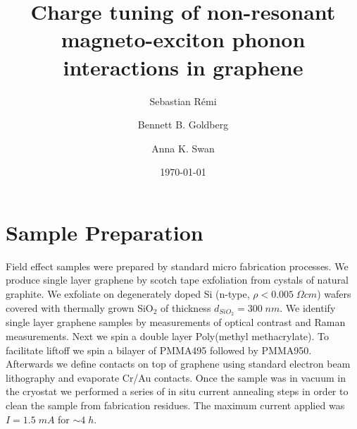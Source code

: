 \documentclass[pra,aps,superscriptaddress,preprint]{revtex4-1}
\begin{document}
\title{Charge tuning of non-resonant magneto-exciton phonon interactions in graphene} %

\author{Sebastian R\'{e}mi}

\author{Bennett B. Goldberg}


\author{Anna K. Swan}


\date{\today}



\pacs{}%

\maketitle %

\section{Sample Preparation}
Field effect samples were prepared by standard micro fabrication processes. We produce single layer graphene by scotch tape exfoliation from cystals of natural graphite. We exfoliate on degenerately doped Si (n-type, $\rho < 0.005\; \Omega cm$) wafers covered with thermally grown SiO$_2$ of thickness $d_{SiO_2}=300\; nm$. We identify single layer graphene samples by measurements of optical contrast and Raman measurements. Next we spin a double layer Poly(methyl methacrylate). To facilitate liftoff we spin a bilayer of PMMA495 followed by PMMA950. Afterwards we define contacts on top of graphene using standard electron beam lithography and evaporate Cr/Au contacts. 
Once the sample was in vacuum in the cryostat we performed a series of in situ current annealing steps in order to clean the sample from fabrication residues. The maximum current applied was $I=1.5\; mA$ for $\sim 4\;h$.
\end{document}
